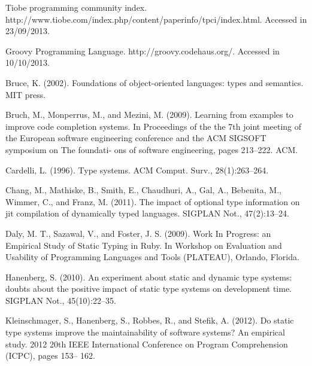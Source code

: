 \documentclass[]{sigplanconf}
\begin{document}
%
%

\renewcommand{\bibfont}{\normalsize}
\begin{thebibliography}{}
\softraggedright

Tiobe programming community index. http://www.tiobe.com/index.php/content/paperinfo/tpci/index.html. Accessed in 23/09/2013.

Groovy Programming Language. http://groovy.codehaus.org/. Accessed in 10/10/2013.

Bruce, K. (2002). Foundations of object-oriented languages: types and semantics. MIT press.

Bruch, M., Monperrus, M., and Mezini, M. (2009). Learning from examples to improve code completion systems. In Proceedings of the the 7th joint meeting of the European software engineering conference and the ACM SIGSOFT symposium on The foundati- ons of software engineering, pages 213–222. ACM.

Cardelli, L. (1996). Type systems. ACM Comput. Surv., 28(1):263–264.

Chang, M., Mathiske, B., Smith, E., Chaudhuri, A., Gal, A., Bebenita, M., Wimmer, C., and Franz, M. (2011). The impact of optional type information on jit compilation of dynamically typed languages. SIGPLAN Not., 47(2):13–24.

Daly, M. T., Sazawal, V., and Foster, J. S. (2009). Work In Progress: an Empirical Study of Static Typing in Ruby. In Workshop on Evaluation and Usability of Programming Languages and Tools (PLATEAU), Orlando, Florida.

Hanenberg, S. (2010). An experiment about static and dynamic type systems: doubts about the positive impact of static type systems on development time. SIGPLAN Not., 45(10):22–35.

Kleinschmager, S., Hanenberg, S., Robbes, R., and Stefik, A. (2012). Do static type systems improve the maintainability of software systems? An empirical study. 2012 20th IEEE International Conference on Program Comprehension (ICPC), pages 153– 162.


\end{thebibliography}
\end{document}
